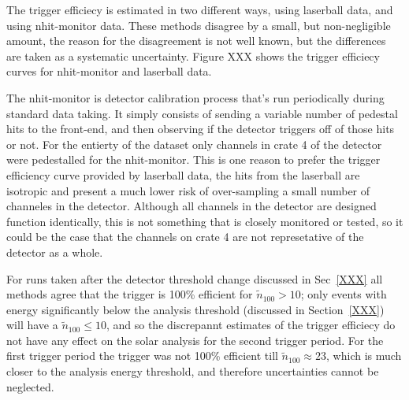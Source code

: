 The trigger efficiecy is estimated in two different ways, using laserball
data, and using nhit-monitor data.
These methods disagree by a small, but non-negligible amount, the
reason for the disagreement is not well known, but the differences are taken
as a systematic uncertainty. Figure XXX shows the trigger efficiecy curves
for nhit-monitor and laserball data.

The nhit-monitor is detector calibration  process that's run periodically during
standard data taking. It simply consists of sending a variable number
of pedestal hits to the front-end, and then observing if the detector triggers
off of those hits or not. For the entierty of the dataset only channels in
crate 4 of the detector were pedestalled for the nhit-monitor.
This is one reason to prefer the trigger efficiency curve provided by laserball
data, the hits from the laserball are isotropic and present a much lower risk of
over-sampling a small number of channeles in the detector. Although all channels
in the detector are designed function identically, this is not something that
is closely monitored or tested, so it could be the case that the channels on
crate 4 are not represetative of the detector as a whole.

For runs taken after the detector threshold change discussed in Sec~\ref{XXX}
all methods agree that the trigger is 100\% efficient for $\tilde{n}_{100} > 10$;
only events with energy significantly below the analysis threshold (discussed
in Section~\ref{XXX}) will have a $\tilde{n}_{100} \le 10$, and so the discrepannt
estimates of the trigger
efficiecy do not have any effect on the solar analysis for the second trigger period.
For the first trigger period the trigger was not 100\% efficient till
$\tilde{n}_{100} \approx 23$, which is much closer to the analysis energy
threshold, and therefore uncertainties cannot be neglected.

